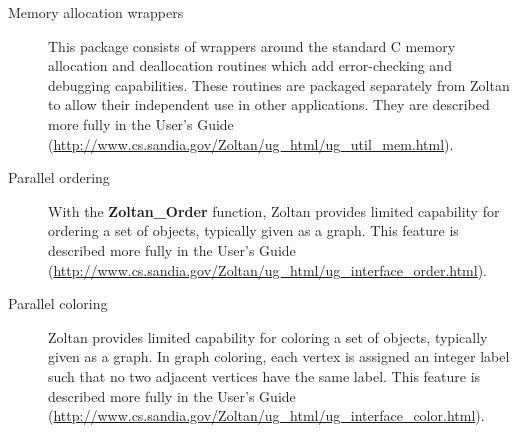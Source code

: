 \begin{description}
\item [Memory allocation wrappers]
This package consists of wrappers around the standard C memory allocation and
deallocation routines which add error-checking and debugging capabilities. These
routines are packaged separately from Zoltan to allow their independent use in other
applications.
They are described more fully in the User's Guide
(\url{http://www.cs.sandia.gov/Zoltan/ug\_html/ug\_util\_mem.html}).

\item [Parallel ordering]
With the \textbf{Zoltan\_Order} function,
Zoltan provides limited capability for ordering a set of objects, typically
given as a graph.
This feature is described more fully in the User's Guide
(\url{http://www.cs.sandia.gov/Zoltan/ug\_html/ug\_interface\_order.html}).

\item [Parallel coloring]
Zoltan provides limited capability for coloring a set of objects, typically given
as a graph. In graph coloring, each vertex is assigned an integer label such
that no two adjacent vertices have the same label.
This feature is described more fully in the User's Guide
(\url{http://www.cs.sandia.gov/Zoltan/ug\_html/ug\_interface\_color.html}).
\end{description}
